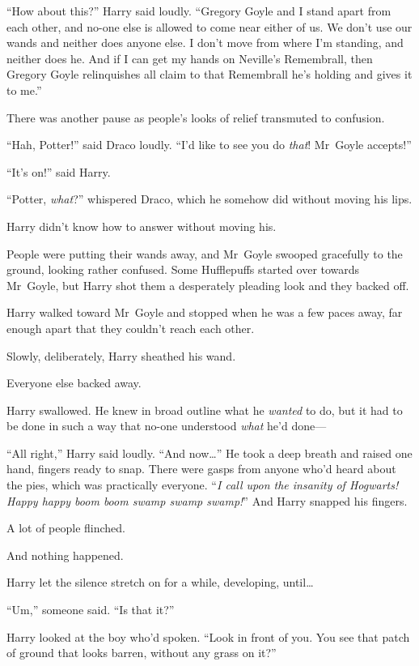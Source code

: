 “How about this?” Harry said loudly.
“Gregory Goyle and I stand apart from each other, and no-one else is allowed to come near either of us. We don’t use our wands and neither does anyone else. I don’t move from where I’m standing, and neither does he. And if I can get my hands on Neville’s Remembrall, then Gregory Goyle relinquishes all claim to that Remembrall he’s holding and gives it to me.”

There was another pause as people’s looks of relief transmuted to confusion.

“Hah, Potter!” said Draco loudly.
“I’d like to see you do \emph{that}! Mr~Goyle accepts!”

“It’s on!” said Harry.

“Potter, \emph{what}?” whispered Draco, which he somehow did without moving his lips.

Harry didn’t know how to answer without moving his.

People were putting their wands away, and Mr~Goyle swooped gracefully to the ground, looking rather confused. Some Hufflepuffs started over towards Mr~Goyle, but Harry shot them a desperately pleading look and they backed off.

Harry walked toward Mr~Goyle and stopped when he was a few paces away, far enough apart that they couldn’t reach each other.

Slowly, deliberately, Harry sheathed his wand.

Everyone else backed away.

Harry swallowed. He knew in broad outline what he \emph{wanted} to do, but it had to be done in such a way that no-one understood \emph{what} he’d done—

“All right,” Harry said loudly.
“And now…” He took a deep breath and raised one hand, fingers ready to snap. There were gasps from anyone who’d heard about the pies, which was practically everyone. “\emph{I call upon the insanity of Hogwarts! Happy happy boom boom swamp swamp swamp!}” And Harry snapped his fingers.

A lot of people flinched.

And nothing happened.

Harry let the silence stretch on for a while, developing, until…

“Um,” someone said.
“Is that it?”

Harry looked at the boy who’d spoken.
“Look in front of you. You see that patch of ground that looks barren, without any grass on it?”

